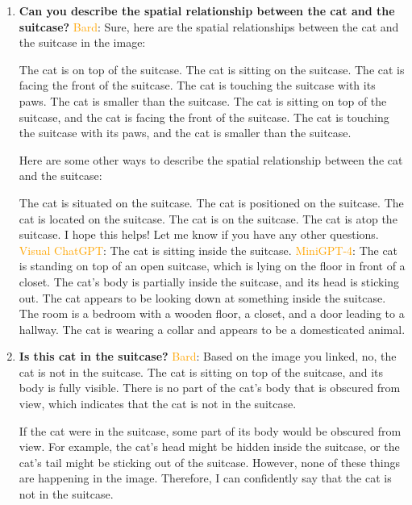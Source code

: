     \begin{enumerate}
        \item \textbf{Can you describe the spatial relationship between the cat and the suitcase?}
        \subitem \textcolor{orange}{Bard}: 
        Sure, here are the spatial relationships between the cat and the suitcase in the image:
        
        The cat is on top of the suitcase.
        The cat is sitting on the suitcase.
        The cat is facing the front of the suitcase.
        The cat is touching the suitcase with its paws.
        The cat is smaller than the suitcase.
        The cat is sitting on top of the suitcase, and the cat is facing the front of the suitcase. The cat is touching the suitcase with its paws, and the cat is smaller than the suitcase.
        
        Here are some other ways to describe the spatial relationship between the cat and the suitcase:
        
        The cat is situated on the suitcase.
        The cat is positioned on the suitcase.
        The cat is located on the suitcase.
        The cat is on the suitcase.
        The cat is atop the suitcase.
        I hope this helps! Let me know if you have any other questions.
        \subitem \textcolor{orange}{Visual ChatGPT}: The cat is sitting inside the suitcase.
        \subitem \textcolor{orange}{MiniGPT-4}: The cat is standing on top of an open suitcase, which is lying on the floor in front of a closet. The cat’s body is partially inside the suitcase, and its head is sticking out. The cat appears to be looking down at something inside the suitcase. The room is a bedroom with a wooden floor, a closet, and a door leading to a hallway. The cat is wearing a collar and appears to be a domesticated animal.
        \item \textbf{Is this cat in the suitcase?}
        \subitem \textcolor{orange}{Bard}: 
        Based on the image you linked, no, the cat is not in the suitcase. The cat is sitting on top of the suitcase, and its body is fully visible. There is no part of the cat's body that is obscured from view, which indicates that the cat is not in the suitcase.
        
        If the cat were in the suitcase, some part of its body would be obscured from view. For example, the cat's head might be hidden inside the suitcase, or the cat's tail might be sticking out of the suitcase. However, none of these things are happening in the image. Therefore, I can confidently say that the cat is not in the suitcase.
        

\end{enumerate}
